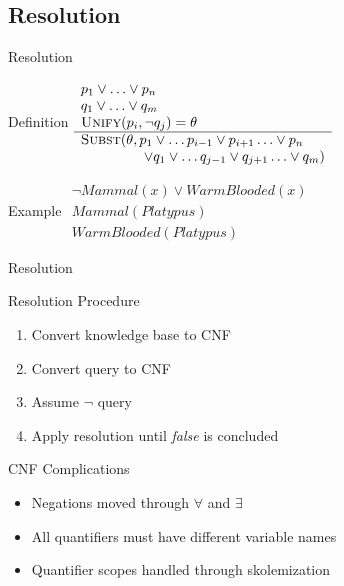 \documentclass[14pt]{beamer}
\begin{document}
\subsection{Resolution}
\begin{frame}{Resolution}
	\begin{block}{Definition}
		$
		\begin{array}{l}
			p_1 \lor \ldots \lor p_n \\
			q_1 \lor \ldots \lor q_m \\
			\textsc{Unify}(p_i, \lnot q_j) = \theta \\
			\hline
			\textsc{Subst}(\theta, p_1 \lor \ldots p_{i-1} \lor p_{i+1} \ldots \lor p_n \\
			\hspace{4.5em} \lor q_1 \lor \ldots q_{j-1} \lor q_{j+1}  \ldots \lor q_m)
		\end{array}
		$
	\end{block}
	\pause
	\begin{block}{Example}
		$
		\begin{array}{l}
			\lnot \textit{Mammal}(x) \lor \textit{WarmBlooded}(x) \\
			\textit{Mammal}(\textit{Platypus}) \\
			\hline
			\textit{WarmBlooded}(\textit{Platypus})
		\end{array}
		$
	\end{block}
\end{frame}
\begin{frame}{Resolution}
	\begin{block}{Resolution Procedure}
		\begin{enumerate}
			\item Convert knowledge base to CNF
			\item Convert query to CNF
			\item Assume $\lnot$ query
			\item Apply resolution until \textit{false} is concluded
		\end{enumerate}
	\end{block}
	\pause
	\begin{block}{CNF Complications}
		\begin{itemize}
			\item Negations moved through $\forall$ and $\exists$
			\item All quantifiers must have different variable names
			\item Quantifier scopes handled through \alert{skolemization}
		\end{itemize}
	\end{block}
\end{frame}
\end{document}
